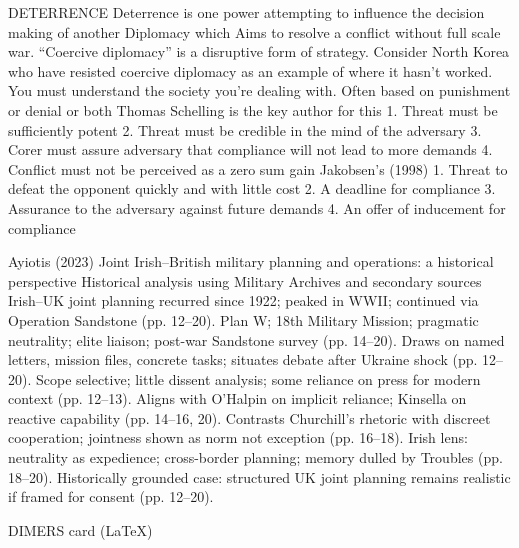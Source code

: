 
DETERRENCE
Deterrence is one power attempting to influence the decision making of another
Diplomacy which Aims to resolve a conflict without full scale war. “Coercive diplomacy” is a disruptive form of strategy.
Consider North Korea who have resisted coercive diplomacy as an example of where it hasn’t worked. You must understand the society you’re dealing with.
Often based on punishment or denial or both
Thomas Schelling is the key author for this
1.	Threat must be sufficiently potent
2.	Threat must be credible in the mind of the adversary
3.	Corer must assure adversary that compliance will not lead to more demands
4.	Conflict must not be perceived as a zero sum gain
Jakobsen’s (1998)
1.	Threat to defeat the opponent quickly and with little cost
2.	A deadline for compliance
3.	Assurance to the adversary against future demands
4.	An offer of inducement for compliance




Ayiotis (2023) Joint Irish–British military planning and operations: a historical perspective Historical analysis using Military Archives and secondary sources Irish–UK joint planning recurred since 1922; peaked in WWII; continued via Operation Sandstone (pp. 12–20). Plan W; 18th Military Mission; pragmatic neutrality; elite liaison; post-war Sandstone survey (pp. 14–20). Draws on named letters, mission files, concrete tasks; situates debate after Ukraine shock (pp. 12–20). Scope selective; little dissent analysis; some reliance on press for modern context (pp. 12–13). Aligns with O’Halpin on implicit reliance; Kinsella on reactive capability (pp. 14–16, 20). Contrasts Churchill’s rhetoric with discreet cooperation; jointness shown as norm not exception (pp. 16–18). Irish lens: neutrality as expedience; cross-border planning; memory dulled by Troubles (pp. 18–20). Historically grounded case: structured UK joint planning remains realistic if framed for consent (pp. 12–20).

DIMERS card (LaTeX)


